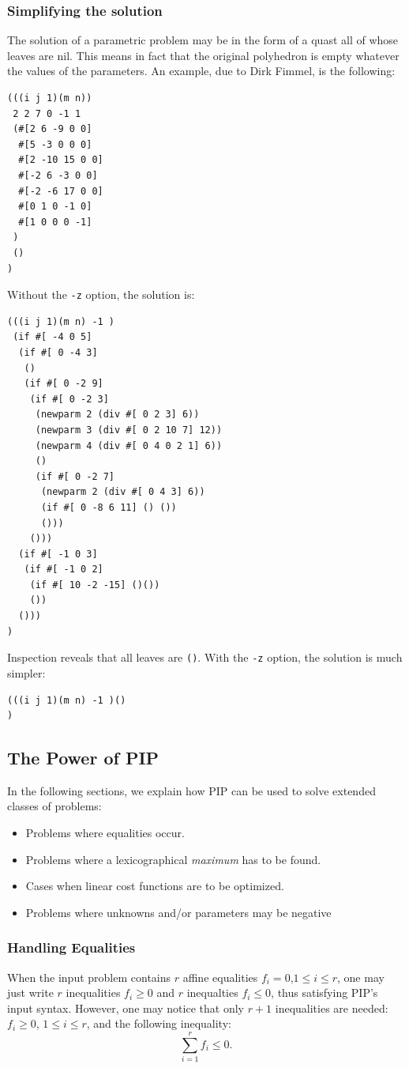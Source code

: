\documentclass[12pt,a4paper]{article}
\begin{document}
\subsubsection{Simplifying the solution}

The solution of a parametric problem may be in the form of a quast all
of whose leaves are nil. This means in fact that the original polyhedron
is empty whatever the values of the parameters. An example, due to Dirk
Fimmel, is the following:

\begin{verbatim}
(((i j 1)(m n))
 2 2 7 0 -1 1
 (#[2 6 -9 0 0]
  #[5 -3 0 0 0]
  #[2 -10 15 0 0]
  #[-2 6 -3 0 0]
  #[-2 -6 17 0 0]
  #[0 1 0 -1 0]
  #[1 0 0 0 -1]
 )
 ()
)
\end{verbatim}
Without the {\tt -z} option, the solution is:
\begin{verbatim}
(((i j 1)(m n) -1 )
 (if #[ -4 0 5]
  (if #[ 0 -4 3] 
   ()
   (if #[ 0 -2 9]
    (if #[ 0 -2 3]
     (newparm 2 (div #[ 0 2 3] 6))
     (newparm 3 (div #[ 0 2 10 7] 12))
     (newparm 4 (div #[ 0 4 0 2 1] 6))
     ()
     (if #[ 0 -2 7]
      (newparm 2 (div #[ 0 4 3] 6))
      (if #[ 0 -8 6 11] () ())
      ()))
    ()))
  (if #[ -1 0 3]
   (if #[ -1 0 2]
    (if #[ 10 -2 -15] ()())
    ())
  ()))
)
\end{verbatim}
Inspection reveals that all leaves are {\tt ()}. With the {\tt -z} option,
the solution is much simpler:
\begin{verbatim}
(((i j 1)(m n) -1 )()
)
\end{verbatim}
\subsection{The Power of PIP}
In the following sections, we explain how PIP can be used to solve 
extended classes of problems:
\begin{itemize}
\item Problems where equalities occur.
\item Problems where a lexicographical {\em maximum} has to
be found. 
\item Cases when linear cost functions are to be optimized.
\item Problems where unknowns and/or parameters may be negative
\end{itemize}

\subsubsection{Handling Equalities}
When the input problem contains $r$ affine equalities $f_i = 0$,$1\leq i\leq r$,
 one may just write $r$ inequalities  $f_i \geq 0$ and $r$ inequalties  $f_i \leq 0$,
 thus satisfying PIP's input syntax. However, one may notice that only $r+1$ inequalities
are needed: $f_i \geq 0$, $1\leq i\leq r$, and the following inequality:
\[ \sum_{i=1}^{r} f_i \leq 0.\]
\end{document}
